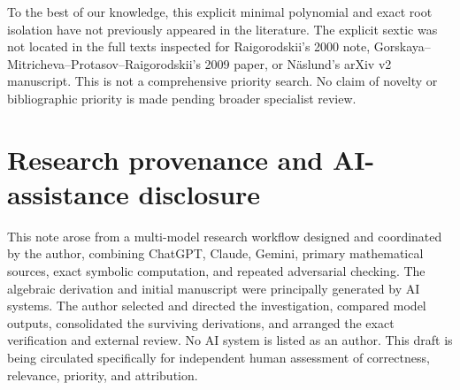 \documentclass[11pt]{article}
\theoremstyle{remark}
\begin{document}
To the best of our knowledge, this explicit minimal polynomial and exact root isolation have not previously appeared in the literature. The explicit sextic was not located in the full texts inspected for Raigorodskii's 2000 note, Gorskaya--Mitricheva--Protasov--Raigorodskii's 2009 paper, or N\"aslund's arXiv v2 manuscript. This is not a comprehensive priority search. No claim of novelty or bibliographic priority is made pending broader specialist review.

\section*{Research provenance and AI-assistance disclosure}
This note arose from a multi-model research workflow designed and coordinated by the author, combining ChatGPT, Claude, Gemini, primary mathematical sources, exact symbolic computation, and repeated adversarial checking. The algebraic derivation and initial manuscript were principally generated by AI systems. The author selected and directed the investigation, compared model outputs, consolidated the surviving derivations, and arranged the exact verification and external review. No AI system is listed as an author. This draft is being circulated specifically for independent human assessment of correctness, relevance, priority, and attribution.
\end{document}

